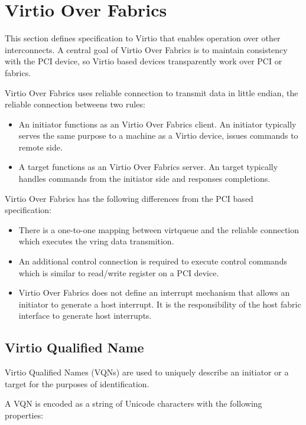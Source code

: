 \section{Virtio Over Fabrics}\label{sec:Virtio Transport Options / Virtio Over Fabrics}

This section defines specification to Virtio that enables operation over other
interconnects. A central goal of Virtio Over Fabrics is to maintain consistency
with the PCI device, so Virtio based devices transparently work over PCI or
fabrics.

Virtio Over Fabrics uses reliable connection to transmit data in little endian,
the reliable connection betweens two rules:

\begin{itemize}
\item An initiator functions as an Virtio Over Fabrics client. An initiator typically serves the same purpose to a machine as a Virtio device, issues commands to remote side.
\item A target functions as an Virtio Over Fabrics server. An target typically handles commands from the initiator side and responses completions.
\end{itemize}

Virtio Over Fabrics has the following differences from the PCI based specification:

\begin{itemize}
\item There is a one-to-one mapping between virtqueue and the reliable connection which executes the vring data transmition.
\item An additional control connection is required to execute control commands which is similar to read/write register on a PCI device.
\item Virtio Over Fabrics does not define an interrupt mechanism that allows an initiator to generate a host interrupt. It is the responsibility of the host fabric interface to generate host interrupts.
\end{itemize}

\subsection{Virtio Qualified Name}\label{sec:Virtio Transport Options / Virtio Over Fabrics / Virtio Qualified Name}
Virtio Qualified Names (VQNs) are used to uniquely describe an initiator or a target for the purposes of identification.

A VQN is encoded as a string of Unicode characters with the following properties:

